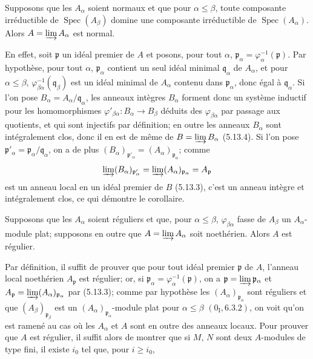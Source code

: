 \begin{corollary}[5.13.6]
\label{IV.2.s5.13.6-fr}
Supposons que les $A_\alpha$ soient normaux et que pour $\alpha\leq\beta$,
toute composante irréductible de $\operatorname{Spec}(A_\beta)$ domine une
composante irréductible de $\operatorname{Spec}(A_\alpha)$. Alors
$A=\varinjlim A_\alpha$ est normal.
\end{corollary}

En effet, soit $\mathfrak p$ un idéal premier de $A$ et posons, pour tout
$\alpha$, $\mathfrak p_\alpha=\varphi_\alpha^{-1}(\mathfrak p)$. Par
hypothèse, pour tout $\alpha$, $\mathfrak p_\alpha$ contient un seul idéal
minimal $\mathfrak q_\alpha$ de $A_\alpha$, et pour $\alpha\leq\beta$,
$\varphi_{\beta\alpha}^{-1}(\mathfrak q_\beta)$ est un idéal minimal de
$A_\alpha$ contenu dans $\mathfrak p_\alpha$, donc égal à
$\mathfrak q_\alpha$. Si l'on pose
$B_\alpha=A_\alpha/\mathfrak q_\alpha$, les anneaux intègres $B_\alpha$
forment donc un système inductif pour les homomorphismes
$\varphi'_{\beta\alpha}:B_\alpha\to B_\beta$ déduits des
$\varphi_{\beta\alpha}$ par passage aux quotients, et qui sont injectifs par
définition; en outre les anneaux $B_\alpha$ sont intégralement clos, donc il en
est de même de $B=\varinjlim B_\alpha$ (5.13.4). Si l'on pose
$\mathfrak p'_\alpha=\mathfrak p_\alpha/\mathfrak q_\alpha$, on a de plus
$(B_\alpha)_{\mathfrak p'_\alpha}=(A_\alpha)_{\mathfrak p_\alpha}$; comme
\[
\varinjlim(B_\alpha)_{\mathfrak p'_\alpha}
=\varinjlim(A_\alpha)_{\mathfrak p_\alpha}=A_{\mathfrak p}
\]
est un anneau local en un idéal premier de $B$ (5.13.3), c'est un anneau
intègre et intégralement clos, ce qui démontre le corollaire.

\begin{proposition}[5.13.7]
\label{IV.2.s5.13.7-fr}
Supposons que les $A_\alpha$ soient réguliers et que, pour
$\alpha\leq\beta$, $\varphi_{\beta\alpha}$ fasse de $A_\beta$ un
$A_\alpha$-module plat; supposons en outre que
$A=\varinjlim A_\alpha$ soit noethérien. Alors $A$ est régulier.
\end{proposition}

Par définition, il suffit de prouver que pour tout idéal premier $\mathfrak p$
de $A$, l'anneau local noethérien $A_{\mathfrak p}$ est régulier; or, si
$\mathfrak p_\alpha=\varphi_\alpha^{-1}(\mathfrak p)$, on a
$\mathfrak p=\varinjlim\mathfrak p_\alpha$ et
$A_{\mathfrak p}=\varinjlim(A_\alpha)_{\mathfrak p_\alpha}$ par (5.13.3);
comme par hypothèse les $(A_\alpha)_{\mathfrak p_\alpha}$ sont réguliers et
que $(A_\beta)_{\mathfrak p_\beta}$ est un
$(A_\alpha)_{\mathfrak p_\alpha}$-module plat pour $\alpha\leq\beta$
$(0_{\mathrm I}, 6.3.2)$, on voit qu'on est ramené au cas où les $A_\alpha$ et
$A$ sont en outre des anneaux locaux. Pour prouver que $A$ est régulier, il
suffit alors de montrer que si $M$, $N$ sont deux $A$-modules de type fini, il
existe $i_0$ tel que, pour $i\geq i_0$,

